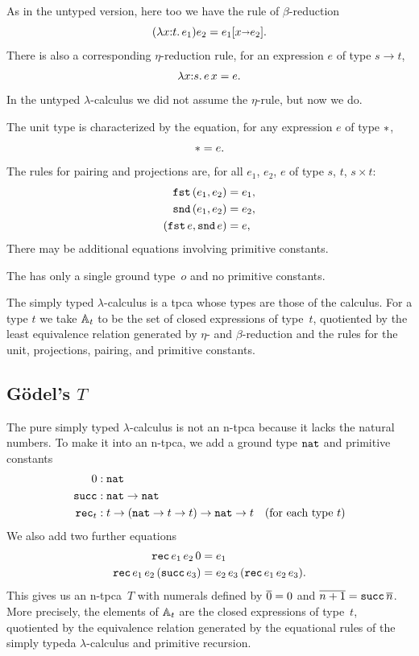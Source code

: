 As in the untyped version, here too we have the rule of
$\beta$-reduction
%
\begin{equation*}
  (\lam{x \of t}{e_1}) e_2 = \subst{e_1}{x \subto e_2}.
\end{equation*}
%
There is also a corresponding $\eta$-reduction rule, for an expression
$e$ of type $s \to t$,
%
\begin{equation*}
  \lam{x \of s}{e\,x} = e.
\end{equation*}
%
In the untyped $\lambda$-calculus we did not assume the $\eta$-rule,
but now we do.

The unit type is characterized by the equation, for any expression $e$
of type $\ttunit$,
%
\begin{equation*}
  \ttunit = e.
\end{equation*}
%
The rules for pairing and projections are, for all $e_1$, $e_2$, $e$
of type $s$, $t$, $s \times t$:
%
\begin{align*}
  \combFst\,(e_1, e_2) &= e_1,
  \\
  \combSnd\,(e_1, e_2) &= e_2,
  \\
  (\combFst\,e, \combSnd\,e) &= e,
\end{align*}
%
There may be additional equations involving primitive constants.

The  has only a single ground
type~$o$ and no primitive constants.

The simply typed $\lambda$-calculus is a tpca whose types are those of the
calculus. For a type $t$ we take $\AA_t$ to be the set of closed
expressions of type~$t$, quotiented by the least equivalence relation
generated by $\eta$- and $\beta$-reduction and the rules for the unit,
projections, pairing, and primitive constants.

\subsection[\texorpdfstring{Gödel's $T$}{Gödel's T}]{Gödel's $T$}

The pure simply typed $\lambda$-calculus is not an n-tpca because it lacks the
natural numbers. To make it into an n-tpca, we
add a ground type $\ttnat$ and primitive constants
%
\begin{align*}
  0 &: \ttnat \\
  \combSucc  &: \ttnat \to \ttnat \\
  \combRec_t &: t \to (\mathtt{nat} \to t \to t) \to \ttnat \to t
  \quad\text{(for each type $t$)}
\end{align*}
%
We also add two further equations
%
\begin{align*}
  \combRec \, e_1 \, e_2 \, 0 &= e_1
  \\
  \combRec \, e_1 \, e_2 \, (\combSucc \, e_3) &=
  e_2 \, e_3 \, (\combRec \, e_1 \, e_2 \, e_3).
\end{align*}
%
This gives us an n-tpca~$T$ with numerals defined by $\numeral{0} = 0$
and $\numeral{n+1} = \combSucc \, \numeral{n}$. More precisely, the
elements of $\AA_t$ are the closed expressions of type~$t$, quotiented by
the equivalence relation generated by the equational rules of the simply typeda
$\lambda$-calculus and primitive recursion.

